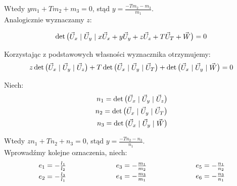 \documentclass[]{mwart}
\theoremstyle{definition}
\newcommand{\matsp}{\hspace*{1mm} | \hspace*{1mm}}
\begin{document}
Wtedy $ym_1 + Tm_2 + m_3 = 0$, stąd $y = \frac{-Tm_2 - m_3}{m_1}$. \\

Analogicznie wyznaczamy $z$:

\[
	\det
		\begin{pmatrix}
			\vec U_x \matsp
			\vec U_y \matsp
			x \vec U_x + y \vec U_y + z \vec U_z + T \vec U_T + \vec W
		\end{pmatrix} = 0
\]

Korzystając z podstawowych własności wyznacznika otrzymujemy:
\[
	z \det
		\begin{pmatrix}
			\vec U_x \matsp
			\vec U_y \matsp
			\vec U_z
		\end{pmatrix}
	+ T \det
		\begin{pmatrix}
			\vec U_x \matsp
			\vec U_y \matsp
			\vec U_T
		\end{pmatrix}
		+ \det
			\begin{pmatrix}
				\vec U_x \matsp
				\vec U_y \matsp
				\vec W
			\end{pmatrix}
		=0
\]

Niech:
\begin{align*}
	n_1 = \det \begin{pmatrix} \vec U_x \matsp \vec U_y \matsp \vec U_z \end{pmatrix} \\
	n_2 = \det \begin{pmatrix} \vec U_x \matsp \vec U_y \matsp \vec U_T \end{pmatrix} \\
	n_3 = \det \begin{pmatrix} \vec U_x \matsp \vec U_y \matsp  \vec W \end{pmatrix}
\end{align*}

Wtedy $zn_1 + Tn_2 + n_3 = 0$, stąd $y = \frac{-Tn_2 - n_3}{n_1}$. \\

Wprowadźmy kolejne oznaczenia, niech:
\[
\begin{minipage}{.35\linewidth}
\centering
$\begin{array}{r@{{}\mathrel{=}{}}l}
	e_1 & - \frac{l_1}{l_2} \\[\jot]
 	e_2 & - \frac{l_3}{l_1}
\end{array}$
\end{minipage}%
\begin{minipage}{.3\linewidth}
\centering
$\begin{array}{r@{{}\mathrel{=}{}}l}
	e_3 & - \frac{m_1}{m_2} \\[\jot]
	e_4 & - \frac{m_3}{m_1}
\end{array}$
\end{minipage}%
\begin{minipage}{.35\linewidth}
\centering
$\begin{array}{r@{{}\mathrel{=}{}}l}
	e_5 & - \frac{n_1}{n_2} \\[\jot]
	e_6 & - \frac{n_3}{n_1}
\end{array}$
\end{minipage}
\]
\end{document}
